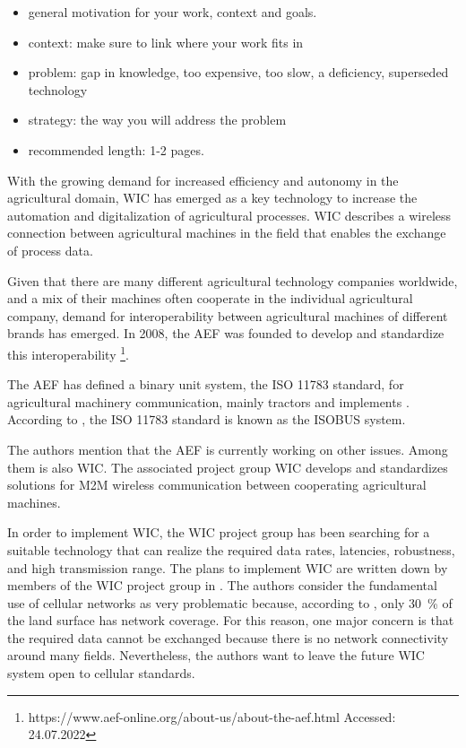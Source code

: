 
\begin{itemize}
\item general motivation for your work, context and goals.
\item context: make sure to link where your work fits in
\item problem: gap in knowledge, too expensive, too slow, a deficiency, superseded technology
\item strategy: the way you will address the problem
\item recommended length: 1-2 pages.
\end{itemize}
With the growing demand for increased efficiency and autonomy in the agricultural domain, \ac{WIC} has emerged as a key technology to increase the automation
and digitalization of agricultural processes. \ac{WIC} describes a wireless connection between agricultural machines
in the field that enables the exchange of process data.

Given that there are many different agricultural technology companies worldwide, and a mix of their machines often cooperate in
the individual agricultural company, demand for interoperability between agricultural machines of different brands
has emerged.
In 2008, the \ac{AEF} was founded to develop and standardize this interoperability
\footnote{https://www.aef-online.org/about-us/about-the-aef.html Accessed: 24.07.2022}.

The AEF has defined a binary unit system, the ISO 11783 standard, for agricultural machinery communication, mainly tractors and
implements \cite{iglesias_enabling_2014}. According to \textcite{schlingmann_aef_2019}, the ISO 11783 standard is known as
the ISOBUS system.

The authors mention that the AEF is currently working on other issues. Among them is also \ac{WIC}.
The associated project group \ac{WIC} develops and standardizes solutions for \ac{M2M} wireless
communication between cooperating agricultural machines.

In order to implement \ac{WIC}, the \ac{WIC} project group has been searching for a suitable technology
that can realize the required data rates, latencies, robustness, and high transmission range.
The plans to implement \ac{WIC} are written down by members of the \ac{WIC} project group in \cite{schlingmann_challenges_2017}.
The authors consider the fundamental use of cellular networks as very problematic
because, according to \cite{itu2016facts}, only \SI{30}{\percent} of the land surface has network coverage.
For this reason, one major concern is that the required data cannot be exchanged because there is
no network connectivity around many fields. Nevertheless, the authors want to leave the future \ac{WIC} system open
to cellular standards.


